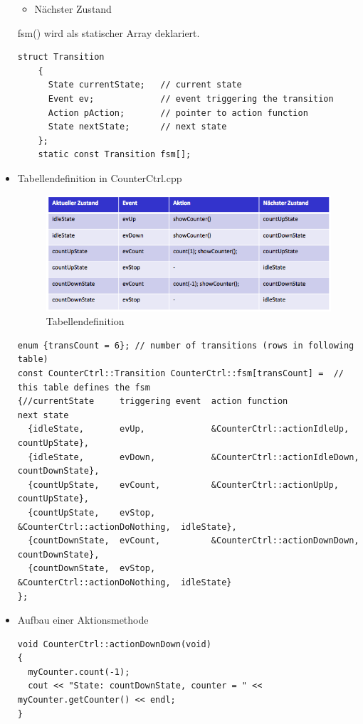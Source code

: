 \begin{itemize}
\begin{itemize}
   \item Nächster Zustand
 \end{itemize}
fsm() wird als statischer Array deklariert.
\begin{lstlisting}
struct Transition
    {
      State currentState;   // current state
      Event ev;             // event triggering the transition
      Action pAction;       // pointer to action function
      State nextState;      // next state
    };
    static const Transition fsm[];
\end{lstlisting}
\item Tabellendefinition in CounterCtrl.cpp
\begin{figure}[h]
  \centering
  {\includegraphics[scale = 0.4]{images/FSM/tabelle}  
  \caption{Tabellendefinition}
  \label{fig:tabelle}}
\end{figure}
\begin{lstlisting}
enum {transCount = 6}; // number of transitions (rows in following table)
const CounterCtrl::Transition CounterCtrl::fsm[transCount] =  // this table defines the fsm
{//currentState     triggering event  action function                 next state
  {idleState,       evUp,             &CounterCtrl::actionIdleUp,     countUpState},
  {idleState,       evDown,           &CounterCtrl::actionIdleDown,   countDownState},
  {countUpState,    evCount,          &CounterCtrl::actionUpUp,       countUpState},
  {countUpState,    evStop,           &CounterCtrl::actionDoNothing,  idleState},
  {countDownState,  evCount,          &CounterCtrl::actionDownDown,   countDownState},
  {countDownState,  evStop,           &CounterCtrl::actionDoNothing,  idleState}
};
\end{lstlisting}
\item Aufbau einer Aktionsmethode
\begin{lstlisting}
void CounterCtrl::actionDownDown(void)
{
  myCounter.count(-1);
  cout << "State: countDownState, counter = " << myCounter.getCounter() << endl;
}
\end{lstlisting}

\end{itemize}
